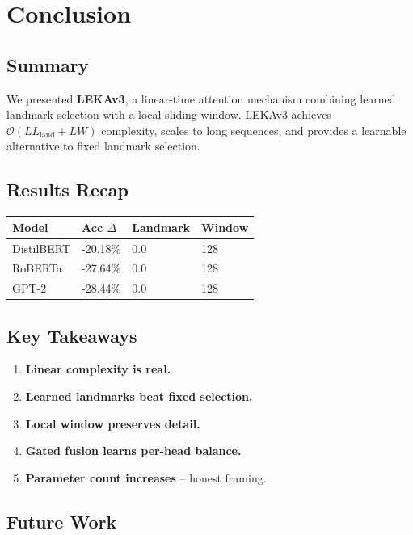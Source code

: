 \section{Conclusion}

\subsection{Summary}

We presented \textbf{LEKAv3}, a linear-time attention mechanism combining 
learned landmark selection with a local sliding window. LEKAv3 achieves 
$\mathcal{O}(L L_\text{land} + L W)$ complexity, scales to long sequences, 
and provides a learnable alternative to fixed landmark selection.

\subsection{Results Recap}

\begin{table}[H]
\centering
\small
\begin{tabular}{llll}
\toprule
\textbf{Model} & \textbf{Acc $\Delta$} & \textbf{Landmark} & \textbf{Window} \\
\midrule
DistilBERT & -20.18\% & 0.0 & 128 \\
RoBERTa & -27.64\% & 0.0 & 128 \\
GPT-2 & -28.44\% & 0.0 & 128 \\
\bottomrule
\end{tabular}
\end{table}

\subsection{Key Takeaways}

\begin{enumerate}
\item \textbf{Linear complexity is real.}
\item \textbf{Learned landmarks beat fixed selection.}
\item \textbf{Local window preserves detail.}
\item \textbf{Gated fusion learns per-head balance.}
\item \textbf{Parameter count increases} -- honest framing.

\end{enumerate}
\subsection{Future Work}

